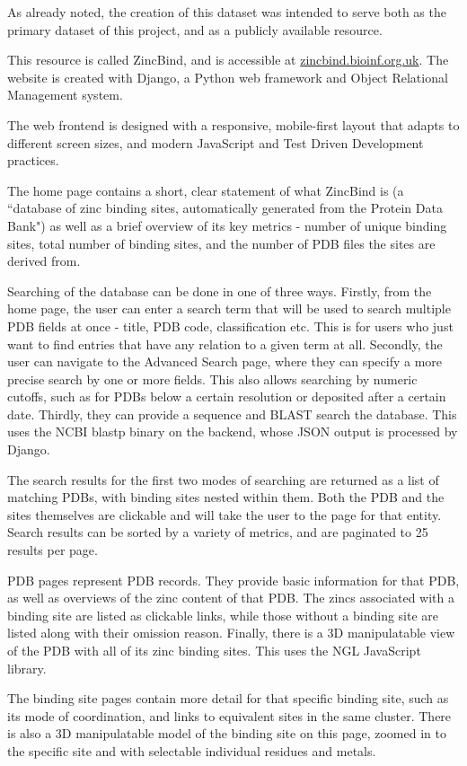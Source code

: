 As already noted, the creation of this dataset was intended to serve both as the primary dataset of this project, and as a publicly available resource.

This resource is called ZincBind, and is accessible at \url{zincbind.bioinf.org.uk}. The website is created with Django, a Python web framework and Object Relational Management system.

The web frontend is designed with a responsive, mobile-first layout that adapts to different screen sizes, and modern JavaScript and Test Driven Development practices.

The home page contains a short, clear statement of what ZincBind is (a ``database of zinc binding sites, automatically generated from the Protein Data Bank") as well as a brief overview of its key metrics - number of unique binding sites, total number of binding sites, and the number of PDB files the sites are derived from.

Searching of the database can be done in one of three ways. Firstly, from the home page, the user can enter a search term that will be used to search multiple PDB fields at once - title, PDB code, classification etc. This is for users who just want to find entries that have any relation to a given term at all. Secondly, the user can navigate to the Advanced Search page, where they can specify a more precise search by one or more fields. This also allows searching by numeric cutoffs, such as for PDBs below a certain resolution or deposited after a certain date. Thirdly, they can provide a sequence and BLAST search the database. This uses the NCBI blastp binary on the backend, whose JSON output is processed by Django.

The search results for the first two modes of searching are returned as a list of matching PDBs, with binding sites nested within them. Both the PDB and the sites themselves are clickable and will take the user to the page for that entity. Search results can be sorted by a variety of metrics, and are paginated to 25 results per page.

PDB pages represent PDB records. They provide basic information for that PDB, as well as overviews of the zinc content of that PDB. The zincs associated with a binding site are listed as clickable links, while those without a binding site are listed along with their omission reason. Finally, there is a 3D manipulatable view of the PDB with all of its zinc binding sites. This uses the NGL JavaScript library.

The binding site pages contain more detail for that specific binding site, such as its mode of coordination, and links to equivalent sites in the same cluster. There is also a 3D manipulatable model of the binding site on this page, zoomed in to the specific site and with selectable individual residues and metals.

